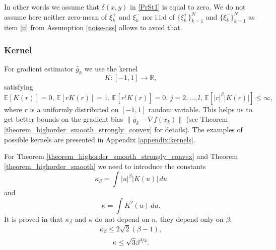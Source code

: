 \documentclass[runningheads]{llncs}
\newcommand{\E}{{\mathbb E}}
\def\E{\mathbb E}
\begin{document}
In other words we assume that $\delta(x,y)$ in \eqref{PrSt1} is equal to zero. 
We do not assume here neither zero-mean of $\xi^+_k$ and $\xi^-_k$ nor i.i.d of $\{\xi^+_k\}_{k=1}^{N}$ and $\{\xi^-_k\}_{k=1}^{N}$ as item \ref{ii} from Assumption \ref{noise-ass} allows to avoid that.










\subsubsection{Kernel}
For gradient estimator $\widetilde{g_k}$ we use the kernel 
\begin{equation*}
    K: [-1, 1] \rightarrow \mathbb{R},
\end{equation*}
satisfying
\begin{equation}\label{kernel-properties}
    \E[K(r)] = 0, \,
    \E[rK(r)] = 1, \, 
    \E [r^j K(r)] = 0,\, j=2, \dots, l, \,
    \E\left[ |r|^{\beta}|K(r)|\right] \leq \infty,
\end{equation}
where $r$ is a uniformly distributed on $[-1, 1]$ random variable. This helps us to get better bounds on the gradient bias $\| \widetilde{g_k} - \nabla f(x_k) \|$ (see Theorem \ref{theorem_highorder_smooth_strongly_convex} for details). The examples of possible kernels are presented in Appendix \ref{appendix:kernels}.

For Theorem \ref{theorem_highorder_smooth_strongly_convex} and Theorem \ref{theorem_highorder_smooth}  we need to introduce the constants
\begin{equation}\label{kappa-beta}
    \kappa_{\beta} = \int|u|^{\beta}|K(u)|\,du
\end{equation}
and 
\begin{equation}\label{kappa-squared}
    \kappa =\int K^2(u) \, du.
\end{equation}
It is proved in \cite{bach2016highly} that $\kappa_{\beta}$ and $\kappa$ do not depend on $n$, they depend only on $\beta$: 
\begin{equation}\label{kappa-beta-bound}
    \kappa_{\beta} \leq 2\sqrt{2} (\beta - 1),
\end{equation}
\begin{equation}\label{kappa-squared-bound}
    \kappa \leq \sqrt{3} \beta^{\nicefrac{3}{2}}.
\end{equation}
\end{document}
